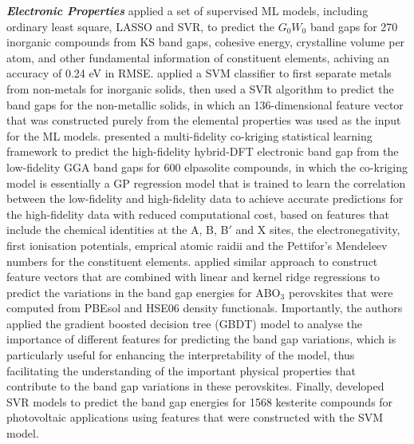 \textbf{\textit{Electronic Properties}}  \citet{lee2016prediction} applied a set of supervised ML models, including ordinary least square, LASSO and SVR, to predict the $G_0 W_0$ band gaps for 270 inorganic compounds from KS band gaps, cohesive energy, crystalline volume per atom, and other fundamental information of constituent elements, achiving an accuracy of 0.24 eV in RMSE. \citet{zhuo2018predicting} applied a SVM classifier to first separate metals from non-metals for inorganic solids, then used a SVR algorithm to predict the band gaps for the non-metallic solids, in which an 136-dimensional feature vector that was constructed purely from the elemental properties was used as the input for the ML models. \citet{pilania2017multi} presented a multi-fidelity co-kriging statistical learning framework to predict the high-fidelity hybrid-DFT electronic band gap from  the low-fidelity GGA band gaps for 600 elpasolite compounds, in which the co-kriging model is essentially a GP regression model that is trained to learn the correlation between the low-fidelity and high-fidelity data to achieve accurate predictions for the high-fidelity data with reduced computational cost, based on features that include the chemical identities at the A, B, B$'$ and X sites, the electronegativity, first ionisation potentials, emprical atomic raidii and the Pettifor's Mendeleev numbers for the constituent elements. \citet{li2022predicting} applied similar approach to construct feature vectors that are combined with linear and kernel ridge regressions to predict the variations in the band gap energies for ABO$_3$ perovskites that were computed from PBEsol and HSE06 density functionals. Importantly, the authors applied the gradient boosted decision tree (GBDT) model to analyse the importance of different features for predicting the band gap variations, which is particularly useful for enhancing the interpretability of the model, thus facilitating the understanding of the important physical properties that contribute to the band gap variations in these perovskites. Finally, \citet{weston2018machine} developed SVR models to predict the band gap energies for 1568 kesterite compounds for photovoltaic applications using features that were constructed with the SVM model. 

